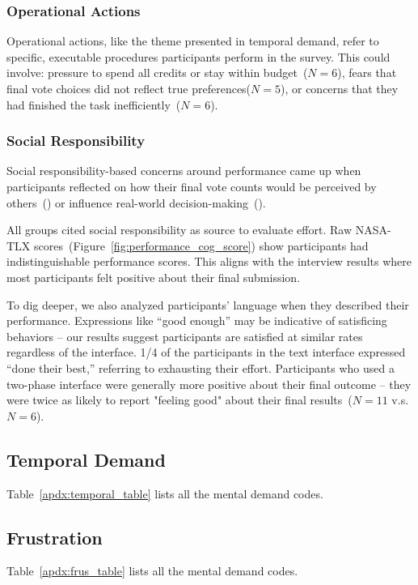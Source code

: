 \subsubsection{Operational Actions}
Operational actions, like the theme presented in temporal demand, refer to specific, executable procedures participants perform in the survey. This could involve: pressure to spend all credits or stay within budget~($N=6$), fears that final vote choices did not reflect true preferences($N=5$), or concerns that they had finished the task inefficiently~($N=6$).


\subsubsection{Social Responsibility}
Social responsibility-based concerns around performance came up when participants reflected on how their final vote counts would be perceived by others~() or influence real-world decision-making~().

All groups cited social responsibility as source to evaluate effort. Raw NASA-TLX scores~(Figure~\ref{fig:performance_cog_score}) show participants had indistinguishable performance scores. This aligns with the interview results where most participants felt positive about their final submission. 

To dig deeper, we also analyzed participants' language when they described their performance. Expressions like ``good enough'' may be indicative of satisficing behaviors -- our results suggest participants are satisfied at similar rates regardless of the interface. 1/4 of the participants in the text interface expressed ``done their best,'' referring to exhausting their effort. Participants who used a two-phase interface were generally more positive about their final outcome -- they were twice as likely to report "feeling good" about their final results~($N=11$ v.s. $N=6$).


\subsection{Temporal Demand}
Table~\ref{apdx:temporal_table} lists all the mental demand codes.
\label{apdx:temporal_table}


\subsection{Frustration}
Table~\ref{apdx:frus_table} lists all the mental demand codes.
\label{apdx:frus_table}